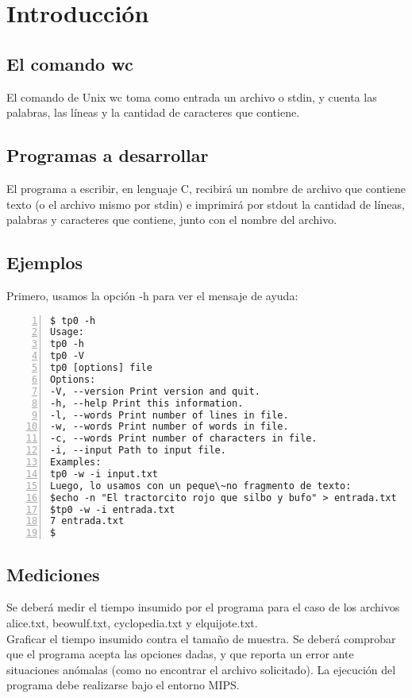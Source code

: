 \chapter{Introducci\'on}\label{ch:introduction}

\section{El comando wc}

El comando de Unix wc toma como entrada un archivo o stdin, y cuenta las palabras, las l\'ineas y la cantidad de caracteres que contiene.

\section{ Programas a desarrollar}
El programa a escribir, en lenguaje C, recibir\'a un nombre de archivo que
contiene texto (o el archivo mismo por stdin) e imprimir\'a por stdout la
cantidad de l\'ineas, palabras y caracteres que contiene, junto con el nombre
del archivo.

\section{Ejemplos}
Primero, usamos la opci\'on -h para ver el mensaje de ayuda:\

\begin{lstlisting}[numbers=left, tabsize=2, basicstyle=\fontsize{11}{13}\ttfamily, frame=single, caption={mensaje de ayuda}]
$ tp0 -h
Usage:
tp0 -h
tp0 -V
tp0 [options] file
Options:
-V, --version Print version and quit.
-h, --help Print this information.
-l, --words Print number of lines in file.
-w, --words Print number of words in file.
-c, --words Print number of characters in file.
-i, --input Path to input file.
Examples:
tp0 -w -i input.txt
Luego, lo usamos con un peque\~no fragmento de texto:
$echo -n "El tractorcito rojo que silbo y bufo" > entrada.txt
$tp0 -w -i entrada.txt
7 entrada.txt
$
\end{lstlisting}

\section{Mediciones}

Se deber\'a medir el tiempo insumido por el programa para el caso de los archivos alice.txt, beowulf.txt, cyclopedia.txt y elquijote.txt. \\

Graficar el tiempo insumido contra el tama\~no de muestra. Se deber\'a comprobar que el programa acepta las opciones dadas, y que reporta un error ante situaciones an\'omalas (como no encontrar el archivo solicitado). La ejecuci\'on del programa debe realizarse bajo el entorno MIPS.
